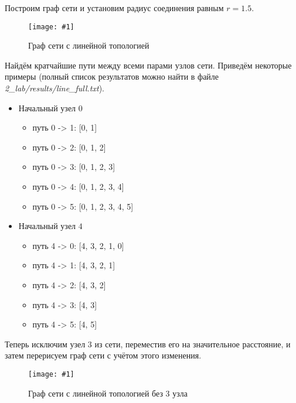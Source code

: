 \documentclass[a4paper,12pt]{article}
\newcommand{\plot}[3]{
    \begin{figure}[H]
        \begin{center}
            \texttt{[image: \#1]}
            \caption{#2}
            \label{#3}
        \end{center}
    \end{figure}
}
\begin{document}
    Построим граф сети и установим радиус соединения равным $ r = 1.5 $.
    \plot{full_line}{Граф сети с линейной топологией}{p:fullLine}

    Найдём кратчайшие пути между всеми парами узлов сети.
    Приведём некоторые примеры (полный список результатов можно найти в файле \textsl{2\_lab/results/line\_full.txt}).
    \begin{itemize}
        \item Начальный узел $ 0 $
        \begin{itemize}
            \item путь 0 -> 1: [0, 1]
            \item путь 0 -> 2: [0, 1, 2]
            \item путь 0 -> 3: [0, 1, 2, 3]
            \item путь 0 -> 4: [0, 1, 2, 3, 4]
            \item путь 0 -> 5: [0, 1, 2, 3, 4, 5]
        \end{itemize} 
        \item Начальный узел $ 4 $
        \begin{itemize}
            \item путь 4 -> 0: [4, 3, 2, 1, 0]
            \item путь 4 -> 1: [4, 3, 2, 1]
            \item путь 4 -> 2: [4, 3, 2]
            \item путь 4 -> 3: [4, 3]
            \item путь 4 -> 5: [4, 5]
        \end{itemize} 
    \end{itemize}
    Теперь исключим узел $ 3 $ из сети, переместив его на значительное расстояние, и затем перерисуем граф сети с учётом этого изменения.

    \plot{rm_line}{Граф сети с линейной топологией без $ 3 $ узла}{p:rmLine}
\end{document}
